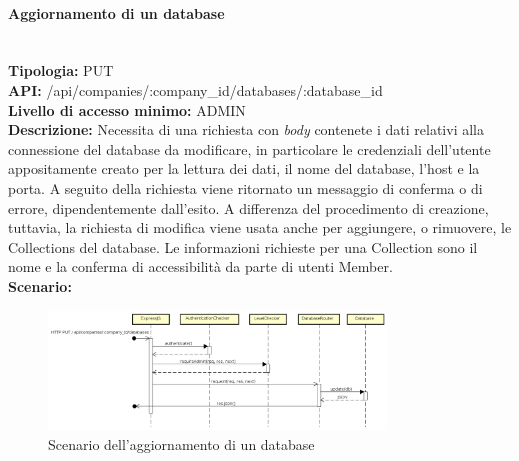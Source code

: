 \paragraph{Aggiornamento di un database}\mbox{}\\
\textbf{Tipologia:} PUT \\
\textbf{API:} /api/companies/:company\_id/databases/:database\_id \\
\textbf{Livello di accesso minimo:} ADMIN \\
\textbf{Descrizione:} Necessita di una richiesta con \textit{body} contenete i dati relativi alla connessione del database da modificare, in particolare le credenziali dell'utente appositamente creato per la lettura dei dati, il nome del database, l'host e la porta. A seguito della richiesta viene ritornato un messaggio di conferma o di errore, dipendentemente dall'esito. A differenza del procedimento di creazione, tuttavia, la richiesta di modifica viene usata anche per aggiungere, o rimuovere, le Collections del database. Le informazioni richieste per una Collection sono il nome e la conferma di accessibilità da parte di utenti Member. \\
\textbf{Scenario:}
\begin{figure}[H]
\centering
\includegraphics[width=0.8\textwidth]{res/sections/backend/sequence/(PUT)database.png}
\caption{Scenario dell'aggiornamento di un database}
\end{figure}

\newpage
